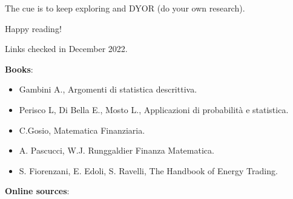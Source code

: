 \documentclass{article}
\begin{document}
The cue is to keep exploring and DYOR (do your own research). 

Happy reading!

Links checked in December 2022.

\textbf{Books}:
\begin{itemize}
    \item Gambini A., Argomenti di statistica descrittiva.
    \item Perisco L, Di Bella E., Mosto L., Applicazioni di probabilità e statistica.
    \item C.Gosio, Matematica Finanziaria.
    \item A. Pascucci, W.J. Runggaldier Finanza Matematica.
    \item S. Fiorenzani, E. Edoli, S. Ravelli, The Handbook of Energy Trading.
\end{itemize}
\textbf{Online sources}:
\end{document}

